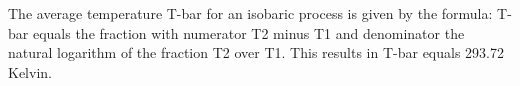 The average temperature T-bar for an isobaric process is given by the formula:
T-bar equals the fraction with numerator T2 minus T1 and denominator the natural logarithm of the fraction T2 over T1. This results in T-bar equals 293.72 Kelvin.